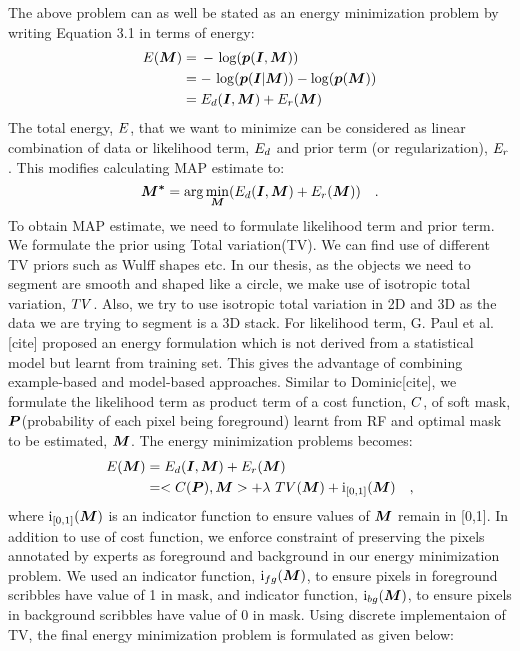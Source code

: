 The above problem can as well be stated as an energy minimization problem by
writing Equation 3.1 in terms of energy:
\begin{align*}
\mathop{{}E}(\boldsymbol{M}) &=\, - \, \log(\boldsymbol{p}(\boldsymbol{I}, \boldsymbol{M})) \\
&= -\, \log(\boldsymbol{p}(\boldsymbol{I}|\boldsymbol{M})) - \log(\boldsymbol{p}(\boldsymbol{M})) \\
&= \mathop{{}E_d}(\boldsymbol{I}, \boldsymbol{M}) + \mathop{{}E_r} (\boldsymbol{M})
\end{align*}
The total energy, $\mathop{{}E}$, that we want to minimize can be considered as linear combination of data or likelihood term, $\mathop{{}E_d}$ and prior term (or regularization), $\mathop{{}E_r}$. This modifies calculating MAP estimate to:
\begin{equation*}
\boldsymbol{M^*} = \arg\min_{\boldsymbol{M}}({\mathop{{}E_d}(\boldsymbol{I}, \boldsymbol{M}) + \mathop{{}E_r} (\boldsymbol{M})}) \quad .
\end{equation*}
To obtain MAP estimate, we need to formulate likelihood term and prior term. We formulate the prior using Total variation(TV). We can find use of different TV priors such as Wulff shapes etc. In our thesis, as the objects we need to segment are smooth and shaped like a circle, we make use of isotropic total variation, $\mathop{{}TV}$. Also, we try to use isotropic total variation in 2D and 3D as the data we are trying to segment is a 3D stack. For likelihood term, G. Paul et al.[cite] proposed an energy formulation which is not derived from a statistical model but learnt from training set. This gives the advantage of combining example-based and model-based approaches. Similar to Dominic[cite], we formulate the likelihood term as product term of a cost function, $\mathop{{}C}$, of soft mask, $\boldsymbol{P}$(probability of each pixel being foreground) learnt from RF and optimal mask to be estimated, $\boldsymbol{M}$. The energy minimization problems becomes:
\begin{align*}
\mathop{{}E}(\boldsymbol{M}) &= \mathop{{}E_d}(\boldsymbol{I}, \boldsymbol{M}) + \mathop{{}E_r} (\boldsymbol{M}) \\
&= <\mathop{{}C}(\boldsymbol{P}), \boldsymbol{M}> + \lambda\, \mathop{{}TV}(\boldsymbol{M}) + \mathrm{i}_{[0,1]}(\boldsymbol{M}) \quad , 
\end{align*}
where $\mathrm{i}_{[0,1]}(\boldsymbol{M})$ is an indicator function to ensure values of $\boldsymbol{M}$ remain in [0,1]. In addition to use of cost function, we enforce constraint of preserving the pixels annotated by experts as foreground and background in our energy minimization problem. We used an indicator function, $\mathrm{i}_{fg}(\boldsymbol{M})$, to ensure pixels in foreground scribbles have value of 1 in mask, and indicator function, $\mathrm{i}_{bg}(\boldsymbol{M})$, to ensure pixels in background scribbles have value of 0 in mask. Using discrete implementaion of TV, the final energy minimization problem is formulated as given below:
